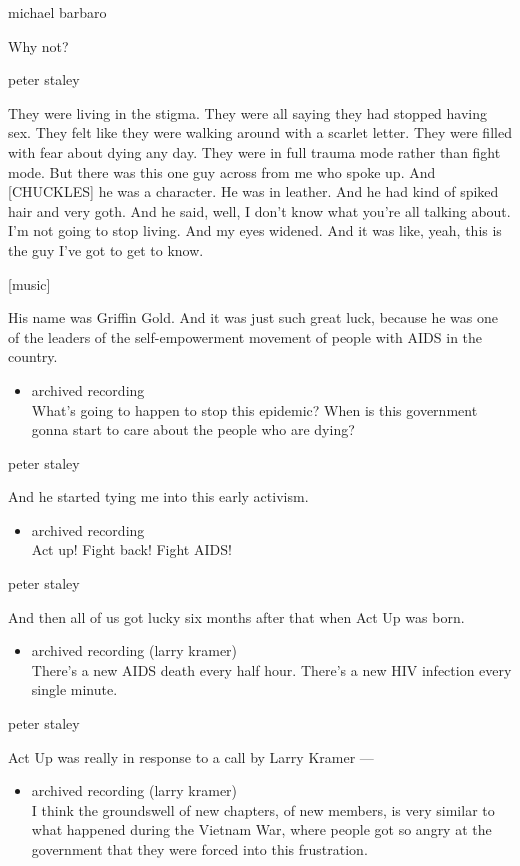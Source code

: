 michael barbaro

Why not?

peter staley

They were living in the stigma. They were all saying they had stopped
having sex. They felt like they were walking around with a scarlet
letter. They were filled with fear about dying any day. They were in
full trauma mode rather than fight mode. But there was this one guy
across from me who spoke up. And {[}CHUCKLES{]} he was a character. He
was in leather. And he had kind of spiked hair and very goth. And he
said, well, I don't know what you're all talking about. I'm not going to
stop living. And my eyes widened. And it was like, yeah, this is the guy
I've got to get to know.

{[}music{]}

His name was Griffin Gold. And it was just such great luck, because he
was one of the leaders of the self-empowerment movement of people with
AIDS in the country.

\begin{itemize}
\tightlist
\item
  archived recording\\
  What's going to happen to stop this epidemic? When is this government
  gonna start to care about the people who are dying?
\end{itemize}

peter staley

And he started tying me into this early activism.

\begin{itemize}
\tightlist
\item
  archived recording\\
  Act up! Fight back! Fight AIDS!
\end{itemize}

peter staley

And then all of us got lucky six months after that when Act Up was born.

\begin{itemize}
\tightlist
\item
  archived recording (larry kramer)\\
  There's a new AIDS death every half hour. There's a new HIV infection
  every single minute.
\end{itemize}

peter staley

Act Up was really in response to a call by Larry Kramer ---

\begin{itemize}
\tightlist
\item
  archived recording (larry kramer)\\
  I think the groundswell of new chapters, of new members, is very
  similar to what happened during the Vietnam War, where people got so
  angry at the government that they were forced into this frustration.
\end{itemize}

